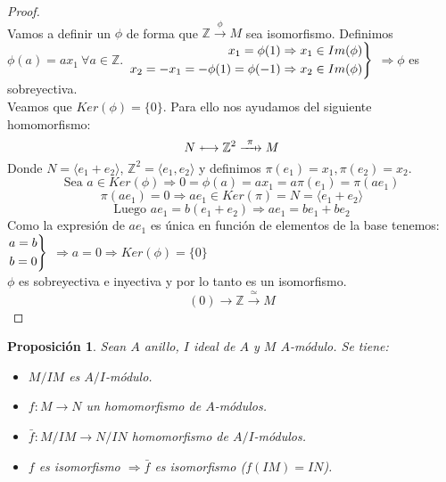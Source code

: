\documentclass{article}
\def\flechaInyectiva{\mathrel{\mkern0mu  \vcenter{\hbox{$\scriptscriptstyle+$}}%
		\mkern-9mu{\longrightarrow}}}
\def\xFlechaSobreyectiva #1{\mathrel{\ooalign{\hfil$\mapstochar\mkern5mu$\thinspace\thinspace\cr$\xrightarrow{#1}$\cr}}}
\newenvironment{rcases}
{\left.\begin{aligned}}
	{\end{aligned}\right\rbrace}
\theoremstyle{theorem-style}  %
\newtheorem{proposition}[theorem]{Proposición}
\theoremstyle{definition}
\theoremstyle{example-style}
\begin{document}
	\begin{proof}
		\ \\
		Vamos a definir un $\phi$ de forma que $\mathbb{Z}\xrightarrow{\ \phi\ }M$ sea isomorfismo.
		Definimos $\phi(a)=ax_1 \ \forall a \in \mathbb{Z}$.
		$\begin{rcases}
			x_1=\phi(1)\Rightarrow x_1\in Im(\phi) \\
			x_2=-x_1=-\phi(1)=\phi(-1)\Rightarrow x_2 \in Im(\phi)
		\end{rcases}$
		$\Rightarrow \phi$ es sobreyectiva. \\
		Veamos que $Ker(\phi)=\{0\}$. Para ello nos ayudamos del siguiente homomorfismo:
		\[ N\flechaInyectiva \mathbb{Z}^2 \xFlechaSobreyectiva{\ \pi\ } M\]
		Donde $N=\langle  e_1+e_2\rangle$, $\mathbb{Z}^2=\langle  e_1,e_2\rangle$ y definimos $\pi(e_1)=x_1, \pi(e_2)=x_2$.
		\[ \text{Sea } a \in Ker(\phi) \Rightarrow 0 = \phi(a)=ax_1=a\pi(e_1)=\pi(ae_1)\]
		\[\pi(ae_1)=0 \Rightarrow ae_1 \in Ker(\pi)=N=\langle e_1 + e_2\rangle\]
		\[\text{Luego } ae_1=b(e_1+e_2) \Rightarrow ae_1=be_1+be_2\]
		Como la expresión de $ae_1$ es única en función de elementos de la base tenemos:\\
		$\begin{rcases}
				a=b \\
				b=0
		\end{rcases}$
		$\Rightarrow a=0 \Rightarrow Ker(\phi)=\{0\}$\\
		$\phi$ es sobreyectiva e inyectiva y por lo tanto es un isomorfismo.
		\[(0)\xrightarrow{\ \ } \mathbb{Z} \xrightarrow{\ \simeq\ }M\]
	\end{proof}


	\begin{proposition}
		Sean $A$ anillo, $I$ ideal de $A$ y $M$ $A$-módulo. Se tiene:
		\begin{itemize}
			\item $M/IM$ es $A/I$-módulo.
			\item $f:M\rightarrow N$ un homomorfismo de $A$-módulos.
			\item $\bar{f}:M/IM\rightarrow N/IN$ homomorfismo de $A/I$-módulos.
			\item $f$ es isomorfismo $\Rightarrow \bar{f}$ es isomorfismo ($f(IM)=IN$).
		\end{itemize}
	\end{proposition}
	
\end{document}
